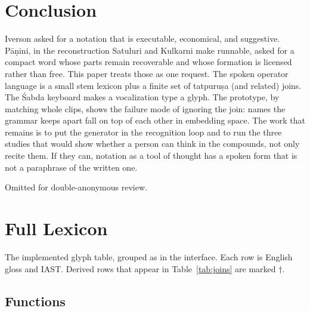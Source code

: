 \documentclass[manuscript, review, anonymous]{acmart}
\begin{document}
\section{Conclusion}

Iverson asked for a notation that is executable, economical, and suggestive. P{\=a}{\d{n}}ini, in the reconstruction Satuluri and Kulkarni make runnable, asked for a compact word whose parts remain recoverable and whose formation is licensed rather than free. This paper treats those as one request. The spoken operator language is a small stem lexicon plus a finite set of tatpuru{\d{s}}a (and related) joins. The {\'S}abda keyboard makes a vocalization type a glyph. The prototype, by matching whole clips, shows the failure mode of ignoring the join: names the grammar keeps apart fall on top of each other in embedding space. The work that remains is to put the generator in the recognition loop and to run the three studies that would show whether a person can think in the compounds, not only recite them. If they can, notation as a tool of thought has a spoken form that is not a paraphrase of the written one.

\begin{acks}
Omitted for double-anonymous review.
\end{acks}




\appendix

\section{Full Lexicon}
\label{app:lexicon}

The implemented glyph table, grouped as in the interface. Each row is English gloss and IAST. Derived rows that appear in Table~\ref{tab:joins} are marked $\dagger$.

\subsection*{Functions}
\end{document}
